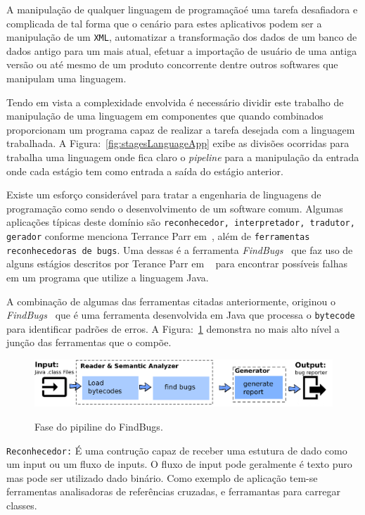 A manipulação de qualquer linguagem de programaçãoé uma tarefa desafiadora e complicada de tal forma que o cenário para estes aplicativos podem ser a manipulação de um \texttt{XML}, automatizar a transformação dos dados de um banco de dados antigo para um mais atual, efetuar a importação de usuário de uma antiga versão ou até mesmo de um produto concorrente dentre outros softwares que manipulam uma linguagem.

Tendo em vista a complexidade envolvida é necessário dividir este trabalho de manipulação de uma linguagem em componentes que quando combinados proporcionam um programa capaz de realizar a tarefa desejada com a linguagem trabalhada. A Figura:~\ref{fig:stagesLanguageApp} exibe as divisões ocorridas para trabalha uma linguagem onde fica claro o \textit{pipeline} para a manipulação da entrada onde cada estágio tem como entrada a saída do estágio anterior.

Existe um esforço considerável para tratar a engenharia de linguagens de programação como sendo o desenvolvimento de um software comum. Algumas aplicações típicas deste domínio são \texttt{reconhecedor, interpretador, tradutor, gerador} conforme menciona Terrance Parr em~\cite{Parr:2009:LIP:1823613},  além de \texttt{ferramentas reconhecedoras de bugs}. Uma dessas é a ferramenta \textit{FindBugs}~\cite{FindBugs} que faz uso de alguns estágios descritos por Terance Parr em ~\cite{Parr:2009:LIP:1823613} para encontrar possíveis falhas em um programa que utilize a linguagem Java.

A combinação de algumas das ferramentas citadas anteriormente, originou o \textit{FindBugs}~\cite{FindBugs} que é uma ferramenta desenvolvida em Java que processa o \texttt{bytecode} para identificar padrões de erros. A Figura:~\ref{fig:findBugs} demonstra no mais alto nível a junção das ferramentas que o compõe. 

\begin{figure}[h]
	\center
	\includegraphics[scale=0.9]{Imagens/pipelineFindbugs}
	\label{fig:findBugs}
	\caption{Fase do pipiline do FindBugs.}
\end{figure}

\texttt{Reconhecedor:} É uma contrução capaz de receber uma estutura de dado como um input ou um fluxo de inputs. O fluxo de input pode geralmente é texto puro mas pode ser utilizado dado binário. Como exemplo de aplicação tem-se ferramentas analisadoras de referências cruzadas, e ferramantas para carregar classes.

